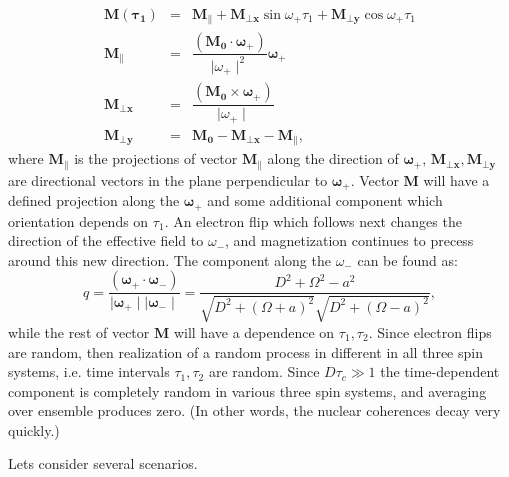 \documentclass[a4paper, 12pt]{article}
\begin{document}
\begin{equation}
\begin{array}{lcl}
      \bm{M(\tau_1)}  &=&  \bm{M_{\parallel}}  + \bm{M_{\bot x} }  \sin \omega_{+} \tau_1 + \bm{M_{\bot y}} \cos \omega_{+} \tau_1\\
      \bm{M_{\parallel}} &=& \dfrac{(\bm{M_0} \cdot \bm{\omega_{+}})}{  \mid \omega_{+} \mid ^2}  \bm{\omega_{+}} \\
      \bm{M_{\bot x}} &=&  \dfrac{(\bm{M_0} \times \bm{\omega_{+}})}{  \mid \omega_{+} \mid } \\
      \bm{M_{\bot y}} &=&        \bm{M_{0}} - \bm{M_{\bot x}} - \bm{M_{\parallel}},
\end{array}
\end{equation}
where $\bm{M_{\parallel}}$ is the  projections of vector $\bm{M_{\parallel}}$  along the direction of $\bm{\omega_{+}}$, $\bm{M_{\bot x}}, \bm{M_{\bot y}}$ are directional vectors in the plane perpendicular to $\bm{\omega_{+}}$. Vector $\bm{M}$ will have a defined projection along the $\bm{\omega_{+}}$ and some additional component which orientation depends on $\tau_1$. 
An electron flip which follows next changes the direction of the effective field to $\omega_{-}$, and magnetization continues to precess around this new direction. The component along the $\omega_{-}$ can be found as:
\begin{equation}
    q = \dfrac{(\bm{\omega_{+}} \cdot \bm{\omega_{-}}  )}{ \mid  \bm{\omega_{+}}  \mid  \mid \bm{\omega_{-}}  \mid    } =  \dfrac{D^2 + \Omega^2 - a^2}{\sqrt{D^2 + (\Omega + a )^2}  \sqrt{D^2 + (\Omega - a )^2}},
\end{equation}
while the rest of vector $\bm{M}$ will have a dependence on $\tau_1, \tau_2$. Since electron flips are random, then realization of a random process in different in all three spin systems, i.e. time intervals $\tau_1, \tau_2$ are random. Since $D \tau_c \gg 1$ the time-dependent component is completely random in various three spin systems, and averaging over ensemble produces zero. (In other words, the nuclear coherences decay very quickly.)

Lets consider several scenarios.
\end{document}
